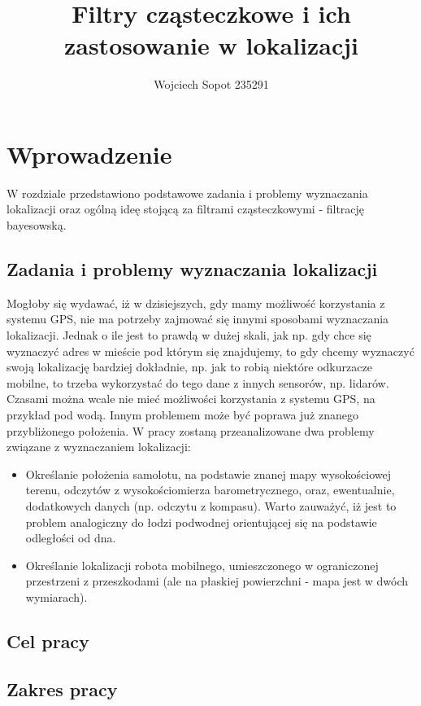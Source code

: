 \documentclass[10pt,a4paper]{article}
\author{Wojciech Sopot 235291}
\title{Filtry cząsteczkowe i ich zastosowanie w lokalizacji}
\begin{document}
\maketitle
\tableofcontents
\newpage
\section{Wprowadzenie}W rozdziale przedstawiono podstawowe zadania i problemy wyznaczania lokalizacji oraz ogólną ideę stojącą za filtrami cząsteczkowymi - filtrację bayesowską.
\subsection{Zadania i problemy wyznaczania lokalizacji}
Mogłoby się wydawać, iż w dzisiejszych, gdy mamy możliwość korzystania z systemu GPS, nie ma potrzeby zajmować się innymi sposobami wyznaczania lokalizacji. Jednak o ile jest to prawdą w dużej skali, jak np. gdy chce się wyznaczyć adres w mieście pod którym się znajdujemy, to gdy chcemy wyznaczyć swoją lokalizację bardziej dokładnie, np. jak to robią niektóre odkurzacze mobilne, to trzeba wykorzystać do tego dane z innych sensorów, np. lidarów. Czasami można wcale nie mieć możliwości korzystania z systemu GPS, na przykład pod wodą. Innym problemem może być poprawa już znanego przybliżonego położenia. W pracy zostaną przeanalizowane dwa problemy związane z wyznaczaniem lokalizacji:
\begin{itemize}
	\item Określanie położenia samolotu, na podstawie znanej mapy wysokościowej terenu, odczytów z wysokościomierza barometrycznego, oraz, ewentualnie, dodatkowych danych (np. odczytu z kompasu). Warto zauważyć, iż jest to problem analogiczny do łodzi podwodnej orientującej się na podstawie odległości od dna.
	\item Określanie lokalizacji robota mobilnego, umieszczonego w ograniczonej przestrzeni z przeszkodami (ale na płaskiej powierzchni - mapa jest w dwóch wymiarach).
\end{itemize}
\subsection{Cel pracy}
\subsection{Zakres pracy}
\end{document}
